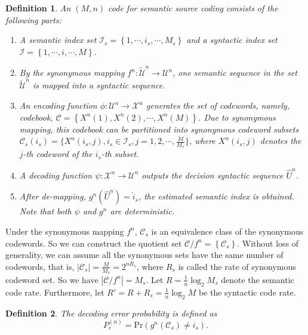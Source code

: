 \documentclass[12pt, draftclsnofoot,onecolumn]{IEEEtran}
\newtheorem{definition}{\bf{Definition}}
\begin{document}
\begin{definition}
An $\left(M,n\right)$ code for semantic source coding consists of the following parts:
\begin{enumerate}[(1)]
   \item A semantic index set $\mathcal{I}_s=\left\{1,\cdots,i_s,\cdots, M_s\right\}$ and a syntactic index set $\mathcal{I}=\left\{1,\cdots,i,\cdots, M\right\}$.
   \item By the synonymous mapping $f^n: \tilde{\mathcal{U}}^n \to \mathcal{U}^n$, one semantic sequence in the set $\tilde{\mathcal{U}}^n$ is mapped into a syntactic sequence.
   \item An encoding function $\phi: \mathcal{U}^n\to  \mathcal{X}^n$ generates the set of codewords, namely, codebook, $\mathcal{C}=\left\{X^n(1),X^n(2),\cdots,X^n(M)\right\}$. Due to synonymous mapping, this codebook can be partitioned into synonymous codeword subsets $\mathcal{C}_s(i_s)=\{X^n(i_s,j),i_s\in \mathcal{I}_s,j=1,2,\cdots,\frac{M}{M_s}\}$, where $X^n(i_s,j)$ denotes the $j$-th codeword of the $i_s$-th subset.
   \item A decoding function $\psi: \mathcal{X}^n \to \mathcal{U}^n$ outputs the decision syntactic sequence $\hat{U}^n$.
   \item After de-mapping, $g^n (\hat{U}^n)=\hat{i}_s$, the estimated semantic index is obtained. Note that both $\psi$ and $g^n$ are deterministic.
\end{enumerate}
\end{definition}

Under the synonymous mapping $f^n$, $\mathcal{C}_s$ is an equivalence class of the synonymous codewords. So we can construct the quotient set $\mathcal{C}/f^n=\left\{\mathcal{C}_s\right\}$. Without loss of generality, we can assume all the synonymous sets have the same number of codewords, that is, $\left|\mathcal{C}_s\right|=\frac{M}{M_s}=2^{nR_s}$, where $R_s$ is called the rate of synonymous codeword set. So we have $\left|\mathcal{C}/f^n\right|=M_s$. Let $R=\frac{1}{n}\log_2 M_s$ denote the semantic code rate. Furthermore, let $R'=R+R_s=\frac{1}{n}\log_2 M$ be the syntactic code rate.

\begin{definition}
The decoding error probability is defined as
\begin{equation}
P_e^{(n)}=\text{Pr}(g^n (\mathcal{C}_s )\neq i_s).
\end{equation}
\end{definition}
\end{document}
